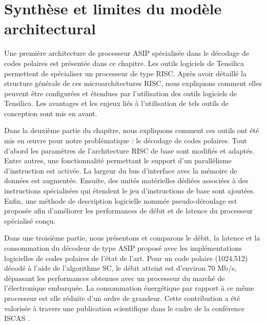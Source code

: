 \section{Synthèse et limites du modèle architectural}

Une première architecture de processeur ASIP spécialisée dans le décodage de codes polaires est présentée dans ce chapitre. Les outils logiciels de Tensilica permettent de spécialiser un processeur de type RISC. Après avoir détaillé la structure générale de ces microarchitectures RISC, nous expliquons comment elles peuvent être configurées et étendues par l'utilisation des outils logiciels de Tensilica. Les avantages et les enjeux liés à l'utilisation de tels outils de conception sont mis en avant.

Dans la deuxième partie du chapitre, nous expliquons comment ces outils ont été mis en œuvre pour notre problématique : le décodage de codes polaires. Tout d'abord les paramètres de l'architecture RISC de base sont modifiés et adaptés. Entre autres, une fonctionnalité permettant le support d'un parallélisme d'instruction est activée. La largeur du bus d'interface avec la mémoire de données est augmentée. Ensuite, des unités matérielles dédiées associées à des instructions spécialisées qui étendent le jeu d'instructions de base sont ajoutées. Enfin, une méthode de description logicielle nommée \og pseudo-déroulage \fg est proposée afin d'améliorer les performances de débit et de latence du processeur spécialisé conçu.

Dans une troisième partie, nous présentons et comparons le débit, la latence et la consommation du décodeur de type ASIP proposé avec les implémentations logicielles de codes polaires de l'état de l'art. Pour un code polaire (1024,512) décodé à l'aide de l'algorithme SC, le débit atteint est d'environ 70 Mb/s, dépassant les performances obtenues avec un processeur du marché de l'électronique embarquée. La consommation énergétique par rapport à ce même processeur est elle réduite d'un ordre de grandeur.
Cette contribution a été valorisée à travers une publication scientifique dans le cadre de la conférence ISCAS .

